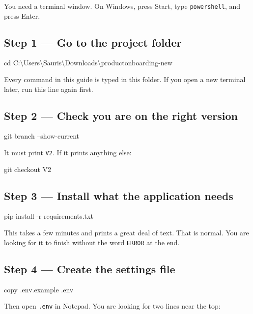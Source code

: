 \documentclass[11pt,a4paper]{article}
\newcommand{\key}[1]{\textsf{\small #1}}  %
\begin{document}
You need a terminal window. On Windows, press \key{Start}, type
\texttt{powershell}, and press \key{Enter}.

\subsection{Step 1 --- Go to the project folder}

\begin{cmd}
cd C:\textbackslash Users\textbackslash Sauris\textbackslash Downloads\textbackslash productonboarding-new
\end{cmd}

Every command in this guide is typed in this folder. If you open a new
terminal later, run this line again first.

\subsection{Step 2 --- Check you are on the right version}

\begin{cmd}
git branch --show-current
\end{cmd}

It must print \texttt{V2}. If it prints anything else:

\begin{cmd}
git checkout V2
\end{cmd}

\subsection{Step 3 --- Install what the application needs}

\begin{cmd}
pip install -r requirements.txt
\end{cmd}

This takes a few minutes and prints a great deal of text. That is normal. You
are looking for it to finish without the word \texttt{ERROR} at the end.

\subsection{Step 4 --- Create the settings file}

\begin{cmd}
copy .env.example .env
\end{cmd}

Then open \texttt{.env} in Notepad. You are looking for two lines near the top:
\end{document}
